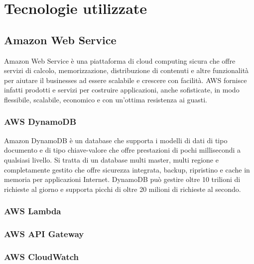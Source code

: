 \chapter{Tecnologie utilizzate}
\label{Tecnologie}
\section{Amazon Web Service}
Amazon Web Service è una piattaforma di cloud computing sicura che offre servizi di calcolo, memorizzazione, distribuzione di contenuti e altre funzionalità per aiutare il businesses ad essere scalabile e crescere con facilità. AWS fornisce infatti prodotti e servizi per costruire applicazioni, anche sofisticate, in modo flessibile, scalabile, economico e  con un'ottima resistenza ai guasti. 
\subsection{AWS DynamoDB}
Amazon DynamoDB è un database che supporta i modelli di dati di tipo documento e di tipo chiave-valore che offre prestazioni di pochi millisecondi a qualsiasi livello. Si tratta di un database multi master, multi regione e completamente gestito che offre sicurezza integrata, backup, ripristino e cache in memoria per applicazioni Internet. DynamoDB può gestire oltre 10 trilioni di richieste al giorno e supporta picchi di oltre 20 milioni di richieste al secondo. 
\subsection{AWS Lambda}
\subsection{AWS API Gateway}
\subsection{AWS CloudWatch}